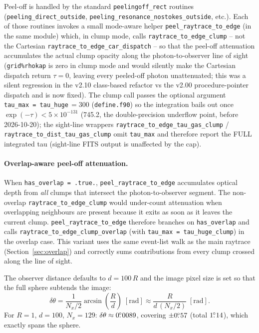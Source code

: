 \documentclass[english,a4paper]{my_memo}
\newcommand{\fdg}{\hbox{$.\!\!^\circ$}}
\begin{document}
\begin{sloppypar}
Peel-off is handled by the standard \texttt{peelingoff\_rect} routines
(\texttt{peeling\_direct\_outside},
\texttt{peeling\_resonance\_\allowbreak{}nostokes\_outside},
etc.).  Each of those routines invokes a small mode-aware helper
\texttt{peel\_raytrace\_to\_edge} (in the same module) which, in
clump mode, calls \texttt{raytrace\_to\_edge\_clump} -- not the
Cartesian \texttt{raytrace\_to\_edge\_car\_dispatch} -- so that the
peel-off attenuation accumulates the actual clump opacity along the
photon-to-observer line of sight (\texttt{grid\%rhokap} is zero in
clump mode and would silently make the Cartesian dispatch return
$\tau = 0$, leaving every peeled-off photon unattenuated; this was a
silent regression in the v2.10 class-based refactor vs the v2.00
procedure-pointer dispatch and is now fixed).  The clump call passes
the optional argument \texttt{tau\_max\,=\,tau\_huge}\,$=300$
(\texttt{define.f90}) so the integration bails out once
$\exp(-\tau)<5\times10^{-131}$ (745.2, the double-precision underflow
point, before 2026-10-20); the sight-line wrappers
\texttt{raytrace\_to\_edge\_tau\_gas\_clump} /
\texttt{raytrace\_to\_dist\_tau\_gas\_clump} omit \texttt{tau\_max} and
therefore report the FULL integrated tau (sight-line FITS output is
unaffected by the cap).
\end{sloppypar}

\paragraph{Overlap-aware peel-off attenuation.}
\begin{sloppypar}
When \texttt{has\_overlap = .true.}, \texttt{peel\_raytrace\_to\_edge}
accumulates optical depth from \emph{all} clumps that intersect the
photon-to-observer segment.  The non-overlap
\texttt{raytrace\_to\_edge\_clump} would under-count attenuation when
overlapping neighbours are present because it exits as soon as it
leaves the current clump.  \texttt{peel\_raytrace\_to\_edge} therefore
branches on \texttt{has\_overlap} and calls
\texttt{raytrace\_to\_edge\_clump\_overlap} (with
\texttt{tau\_max\,=\,tau\_huge\_clump}) in the overlap case.  This
variant uses the same event-list walk as the main raytrace
(Section~\ref{sec:overlap}) and correctly sums contributions from every
clump crossed along the line of sight.
\end{sloppypar}

The observer distance defaults to $d = 100\,R$ and the image pixel size is
set so that the full sphere subtends the image:
\begin{equation}
  \delta\theta = \frac{1}{N_x/2}\arcsin\!\left(\frac{R}{d}\right)\;\mathrm{[rad]}
  \approx \frac{R}{d\,(N_x/2)}\;\mathrm{[rad]}.
\end{equation}
For $R=1$, $d=100$, $N_x=129$: $\delta\theta \approx 0\fdg0089$, covering
$\pm 0\fdg57$ (total $1\fdg14$), which exactly spans the sphere.
\end{document}

